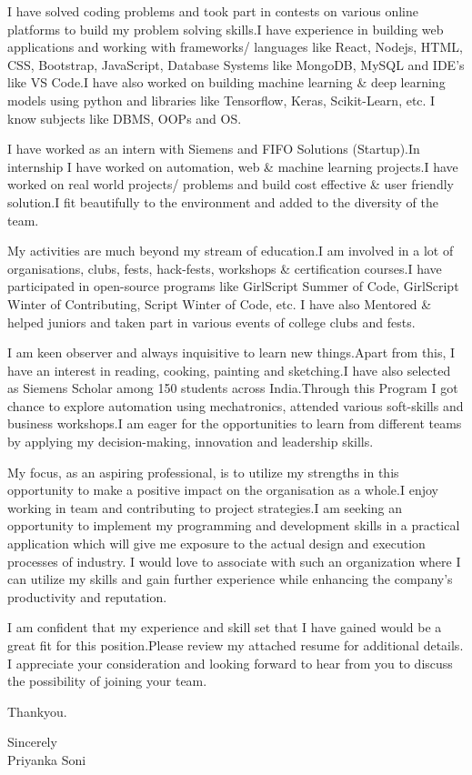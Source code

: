 \documentclass[11pt,a4]{article}
\begin{document}
I have solved coding problems and took part in contests on various online platforms to build my problem solving skills.I have experience in building web applications and working with frameworks/ languages like React, Nodejs, HTML, CSS, Bootstrap, JavaScript, Database Systems like MongoDB, MySQL and IDE's like VS Code.I have also worked on building machine learning \& deep learning models using python and libraries like Tensorflow, Keras, Scikit-Learn, etc. I know subjects like DBMS, OOPs and OS.\par

I have worked as an intern with Siemens and FIFO Solutions (Startup).In internship I have worked on automation, web \& machine learning projects.I have worked on real world projects/ problems and build cost effective \& user friendly solution.I fit beautifully to the environment and added to the diversity of the team.\par

My activities are much beyond my stream of education.I am involved in a lot of organisations, clubs, fests, hack-fests, workshops \& certification courses.I have participated in open-source programs like GirlScript Summer of Code, GirlScript Winter of Contributing, Script Winter of Code, etc. I have also Mentored \& helped juniors and taken part in various events of college clubs and fests.\par 

I am keen observer and always inquisitive to learn new things.Apart from this, I have an interest in reading, cooking, painting and sketching.I have also selected as Siemens Scholar among 150 students across India.Through this Program I got chance to explore automation using mechatronics, attended various soft-skills and business workshops.I am eager for the opportunities to learn from different teams by applying my decision-making, innovation and leadership skills.\par

My focus, as an aspiring professional, is to utilize my strengths in this opportunity to make a positive impact on the organisation as a whole.I enjoy working in team and contributing to project strategies.I am seeking an opportunity to implement my programming and development skills in a practical application which will give me exposure to the actual design and execution processes of industry. I would love to associate with such an organization where I can utilize my skills and gain further experience while enhancing the company’s productivity and reputation.\par

I am confident that my experience and skill set that I have gained would be a great fit for this position.Please review my attached resume for additional details. I appreciate your consideration and looking forward to hear from you to discuss the possibility of joining your team.\par

Thankyou.

\vspace{0.5cm}
\raggedright
Sincerely \\ Priyanka Soni
\end{document}
